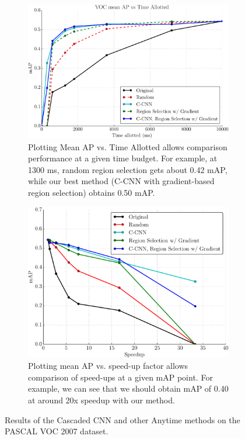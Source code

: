 \begin{figure}[ht]
\begin{subfigure}[b]{\linewidth}
    \centering
    \includegraphics[width=.75\linewidth]{../ccnn/figures/_apvst_final.pdf}
    \caption{
Plotting Mean AP vs. Time Allotted allows comparison performance at a given time budget.
For example, at 1300 ms, random region selection gets about 0.42 mAP, while our best method (C-CNN with gradient-based region selection) obtains 0.50 mAP.
}\label{fig:apvst}
\end{subfigure}
\begin{subfigure}[b]{\linewidth}
    \centering
    \includegraphics[width=.75\linewidth]{../ccnn/figures/_speedup_final_abs.pdf}
    \caption{
Plotting mean AP vs. speed-up factor allows comparison of speed-ups at a given mAP point.
For example, we can see that we should obtain mAP of 0.40 at around 20x speedup with our method.
}\label{fig:speedup}
\end{subfigure}
\caption{
Results of the Cascaded CNN and other Anytime methods on the PASCAL VOC 2007 dataset.
}\label{fig:voc2007_results}
\end{figure}
